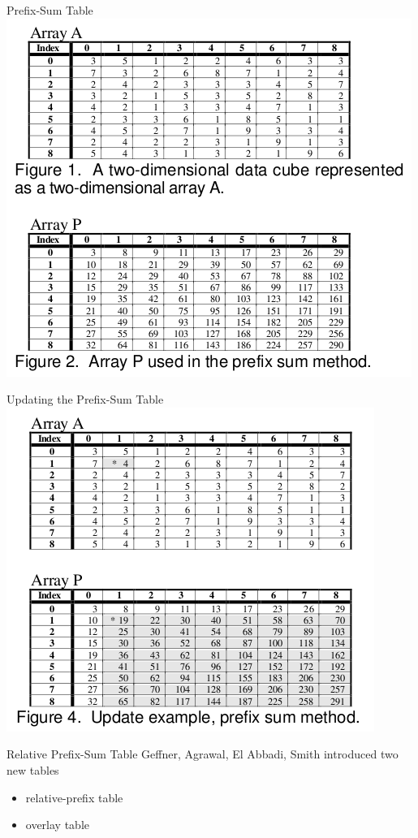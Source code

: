 \documentclass{beamer}
\theoremstyle{definition}
\theoremstyle{definition}
\begin{document}
\begin{frame}{Prefix-Sum Table}
\includegraphics[scale=0.4]{prefixtable.png}
\cite{Geffner99}
\end{frame}

\begin{frame}{Updating the Prefix-Sum Table}
\includegraphics[scale=0.4]{prefixupdate.png}
\cite{Geffner99}
\end{frame}

\begin{frame}{Relative Prefix-Sum Table}
Geffner, Agrawal, El Abbadi, Smith\cite{Geffner99}
introduced two new tables
\begin{itemize}
    \item relative-prefix table
    \item overlay table
\end{itemize}
\end{frame}
\end{document}
